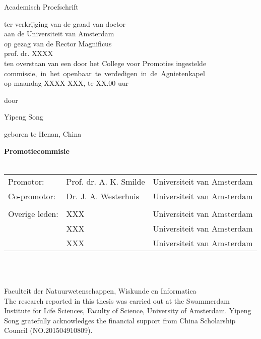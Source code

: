{%
\clearpage
\par\vskip 2cm
\begin{center}
\printtitle
\par\vspace {6cm}
{\large \sc Academisch Proefschrift}
\par\vspace {1cm}
{\large ter verkrijging van de graad van doctor\\
aan de Universiteit van Amsterdam\\
op gezag van de Rector Magnificus\\
prof. dr. XXXX\\                                 %
ten overstaan van een door het College voor Promoties ingestelde\\
\mbox{commissie, in het openbaar te verdedigen in de Agnietenkapel}\\        %
op maandag XXXX XXX, te XX.00 uur \\ }        %
\par\vspace {1cm} {\large door}
\par \vspace {1cm} %
{\Large Yipeng Song \\}                        %
\par\vspace {1cm} %
{\large geboren te Henan, China} %
\end{center}

\clearpage
\par\vskip 2cm

\noindent%
{\bf Promotiecommisie}\\
\\
\begin{tabular}[t]{@{}llr}
Promotor:      & Prof. dr. A. K. Smilde & Universiteit van Amsterdam \\  %
Co-promotor:   & Dr. J. A. Westerhuis   & Universiteit van Amsterdam \\  %
\\
Overige leden: & XXX  & Universiteit van Amsterdam \\  %
               & XXX  & Universiteit van Amsterdam \\  %
               & XXX  & Universiteit van Amsterdam \\  %
\end{tabular}\\
\\

\vfill

\noindent
Faculteit der Natuurwetenschappen, Wiskunde en Informatica\\[2ex] %

\noindent
The research reported in this thesis was carried out at the Swammerdam Institute
for Life Sciences, Faculty of Science, University of Amsterdam. Yipeng Song gratefully acknowledges the financial support from China Scholarship Council (NO.201504910809).
\vskip 2cm
}

